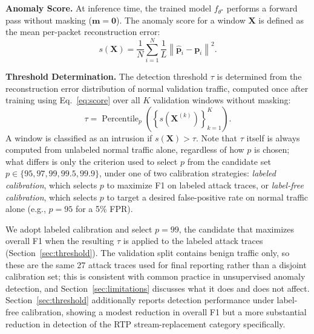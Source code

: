 \noindent\textbf{Anomaly Score.}
At inference time, the trained model $f_{\theta^\star}$ performs a forward pass without masking ($\mathbf{m} = \mathbf{0}$). The anomaly score for a window $\mathbf{X}$ is defined as the mean per-packet reconstruction error:
\begin{equation}
    s(\mathbf{X}) = \frac{1}{N} \sum_{i=1}^{N} \frac{1}{L} \left\| \hat{\mathbf{p}}_i - \mathbf{p}_i \right\|^2.
    \label{eq:score}
\end{equation}

\noindent\textbf{Threshold Determination.}
The detection threshold $\tau$ is determined from the reconstruction error distribution of normal validation traffic, computed once after training using Eq.~\eqref{eq:score} over all $K$ validation windows without masking:
\begin{equation}
    \tau = \operatorname{Percentile}_{p}\!\left(\left\{s\!\left(\mathbf{X}^{(k)}\right)\right\}_{k=1}^{K}\right).
    \label{eq:threshold}
\end{equation}
A window is classified as an intrusion if $s(\mathbf{X}) > \tau$. Note that $\tau$ itself is always computed from unlabeled normal traffic alone, regardless of how $p$ is chosen; what differs is only the criterion used to select $p$ from the candidate set $p \in \{95, 97, 99, 99.5, 99.9\}$, under one of two calibration strategies: \emph{labeled calibration}, which selects $p$ to maximize F1 on labeled attack traces, or \emph{label-free calibration}, which selects $p$ to target a desired false-positive rate on normal traffic alone (e.g., $p=95$ for a 5\% FPR).

We adopt labeled calibration and select $p = 99$, the candidate that maximizes overall F1 when the resulting $\tau$ is applied to the labeled attack traces (Section~\ref{sec:threshold}). The validation split contains benign traffic only, so these are the same 27 attack traces used for final reporting rather than a disjoint calibration set; this is consistent with common practice in unsupervised anomaly detection, and Section~\ref{sec:limitations} discusses what it does and does not affect. Section~\ref{sec:threshold} additionally reports detection performance under label-free calibration, showing a modest reduction in overall F1 but a more substantial reduction in detection of the RTP stream-replacement category specifically.
